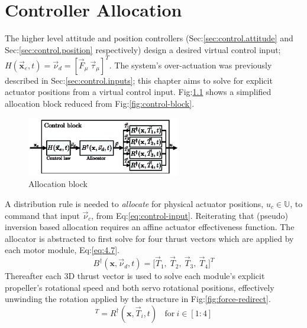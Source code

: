 \chapter{Controller Allocation}
\label{ch:allocation}
The higher level attitude and position controllers (Sec:\ref{sec:control.attitude} and Sec:\ref{sec:control.position} respectively) design a desired virtual control input; $H(\vec{\mathbf{x}}_e,t)=\vec{\nu}_d=[\vec{F}_\mu~\vec{\tau}_\mu]^T$. The system's over-actuation was previously described in Sec:\ref{sec:control.inputs}; this chapter aims to solve for explicit actuator positions from a virtual control input. Fig:\ref{fig:allocation-block} shows a simplified allocation block reduced from Fig:\ref{fig:control-block}.
\begin{figure}[htbp]
\centering
\includegraphics[width=0.6\textwidth]{figs/allocator-block}
\vspace{-6pt}
\caption{Allocation block}
\label{fig:allocation-block}
\vspace{-8pt}
\end{figure}
\par
A distribution rule is needed to \emph{allocate} for physical actuator positions, $u_c\in\mathbb{U}$, to command that input $\vec{\nu}_c$, from Eq:\ref{eq:control-input}. Reiterating that (pseudo) inversion based allocation requires an affine actuator effectiveness function. The allocator is abstracted to first solve for four thrust vectors which are applied by each motor module, Eq:\ref{eq:4.7}.
\begin{equation}
B^{\dagger}(\mathbf{x},\vec{\nu}_d,t)=\big[\vec{T}_1,~\vec{T}_2,~\vec{T}_3,~\vec{T}_4\big]^T
\end{equation}
Thereafter each 3D thrust vector is used to solve each module's explicit propeller's rotational speed and both servo rotational positions, effectively unwinding the rotation applied by the structure in Fig:\ref{fig:force-redirect}.
\begin{equation}
[\Omega_i,~\lambda_i,~\alpha_i]^T=R^\dagger(\mathbf{x},\vec{T}_i,t)~~~~\text{for}~i\in[1:4]
\end{equation}
